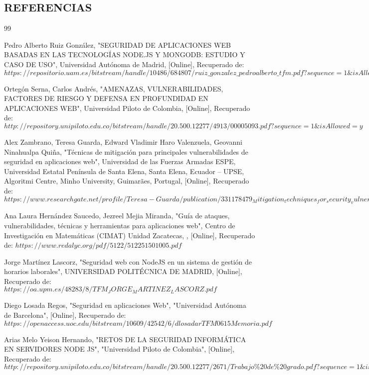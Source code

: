 \begin{center}
  \section{REFERENCIAS}
\end{center}


% 
% 
\begin{thebibliography}{99}

   Pedro Alberto Ruiz González, "SEGURIDAD DE APLICACIONES WEB BASADAS EN LAS TECNOLOGÍAS NODE.JS Y MONGODB: ESTUDIO Y CASO DE USO", Universidad Autónoma de Madrid, [Online], Recuperado de: $https://repositorio.uam.es/bitstream/handle/10486/684807/ruiz\_gonzalez\_pedroalberto\_tfm.pdf?sequence=1\&isAllowed=y$

   Ortegón Serna, Carlos Andrés, "AMENAZAS, VULNERABILIDADES, FACTORES DE RIESGO Y DEFENSA EN PROFUNDIDAD EN APLICACIONES WEB", Universidad Piloto de Colombia, [Online], Recuperado de: $http://repository.unipiloto.edu.co/bitstream/handle/20.500.12277/4913/00005093.pdf?sequence=1\&isAllowed=y$

   Alex Zambrano, Teresa Guarda, Edward Vladimir Haro Valenzuela, Geovanni Ninahualpa Quiña, "Técnicas de mitigación para principales vulnerabilidades de seguridad en aplicaciones web", Universidad de las Fuerzas Armadas ESPE,  Universidad Estatal Península de Santa Elena, Santa Elena, Ecuador – UPSE, Algoritmi Centre, Minho University, Guimarães, Portugal, [Online], Recuperado de: $https://www.researchgate.net/profile/Teresa-Guarda/publication/331178479_Mitigation_techniques_for_security_vulnerabilities_in_web_applications/links/5fabe891a6fdcc331b9478b4/Mitigation-techniques-for-security-vulnerabilities-in-web-applications.pdf$

   Ana Laura Hernández Saucedo, Jezreel Mejia Miranda, "Guía de ataques, vulnerabilidades, técnicas y herramientas para aplicaciones web", Centro de Investigación en Matemáticas (CIMAT) Unidad Zacatecas, , [Online], Recuperado de: $https://www.redalyc.org/pdf/5122/512251501005.pdf$ %

   Jorge Martínez Lascorz, "Seguridad web con NodeJS en un sistema de gestión de horarios laborales", UNIVERSIDAD POLITÉCNICA DE MADRID, [Online], Recuperado de: $https://oa.upm.es/48283/8/TFM_JORGE_MARTINEZ_LASCORZ.pdf$ %

    Diego Losada Regos, "Seguridad en aplicaciones Web", "Universidad Autónoma de Barcelona", [Online], Recuperado de: $https://openaccess.uoc.edu/bitstream/10609/42542/6/dlosadarTFM0615Memoria.pdf$

    Arias Melo Yeison Hernando, "RETOS DE LA SEGURIDAD INFORMÁTICA EN SERVIDORES NODE JS", "Universidad Piloto de Colombia", [Online], Recuperado de: $http://repository.unipiloto.edu.co/bitstream/handle/20.500.12277/2671/Trabajo\%20de\%20grado.pdf?sequence=1\&isAllowed=y$

\end{thebibliography}